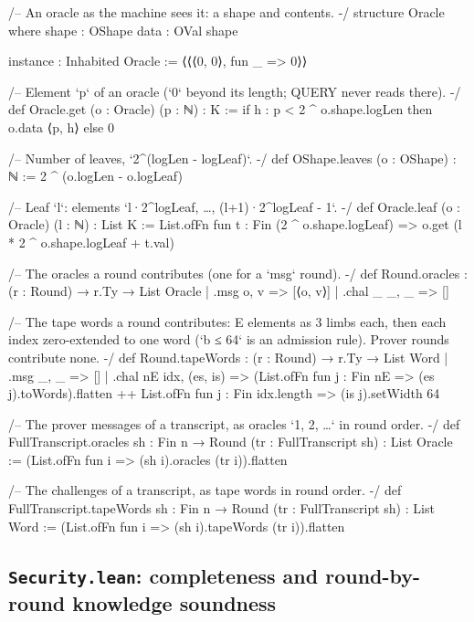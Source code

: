 \begin{leancode}[fontsize=\scriptsize,label={\footnotesize Contract/Shapes.lean}]
/-- An oracle as the machine sees it: a shape and contents. -/
structure Oracle where
  shape : OShape
  data : OVal shape

instance : Inhabited Oracle := ⟨⟨⟨0, 0⟩, fun _ => 0⟩⟩

/-- Element `p` of an oracle (`0` beyond its length; QUERY never reads there). -/
def Oracle.get (o : Oracle) (p : ℕ) : K := if h : p < 2 ^ o.shape.logLen then o.data ⟨p, h⟩ else 0

/-- Number of leaves, `2^(logLen - logLeaf)`. -/
def OShape.leaves (o : OShape) : ℕ := 2 ^ (o.logLen - o.logLeaf)

/-- Leaf `l`: elements `l·2^logLeaf, …, (l+1)·2^logLeaf - 1`. -/
def Oracle.leaf (o : Oracle) (l : ℕ) : List K :=
  List.ofFn fun t : Fin (2 ^ o.shape.logLeaf) => o.get (l * 2 ^ o.shape.logLeaf + t.val)

/-- The oracles a round contributes (one for a `msg` round). -/
def Round.oracles : (r : Round) → r.Ty → List Oracle
  | .msg o, v => [⟨o, v⟩]
  | .chal _ _, _ => []

/-- The tape words a round contributes: E elements as 3 limbs each, then each index
zero-extended to one word (`b ≤ 64` is an admission rule). Prover rounds contribute none. -/
def Round.tapeWords : (r : Round) → r.Ty → List Word
  | .msg _, _ => []
  | .chal nE idx, (es, is) =>
      (List.ofFn fun j : Fin nE => (es j).toWords).flatten ++
        List.ofFn fun j : Fin idx.length => (is j).setWidth 64

/-- The prover messages of a transcript, as oracles `1, 2, …` in round order. -/
def FullTranscript.oracles {sh : Fin n → Round} (tr : FullTranscript sh) : List Oracle :=
  (List.ofFn fun i => (sh i).oracles (tr i)).flatten

/-- The challenges of a transcript, as tape words in round order. -/
def FullTranscript.tapeWords {sh : Fin n → Round} (tr : FullTranscript sh) : List Word :=
  (List.ofFn fun i => (sh i).tapeWords (tr i)).flatten
\end{leancode}

\subsection{\texttt{Security.lean}: completeness and round-by-round knowledge soundness}

